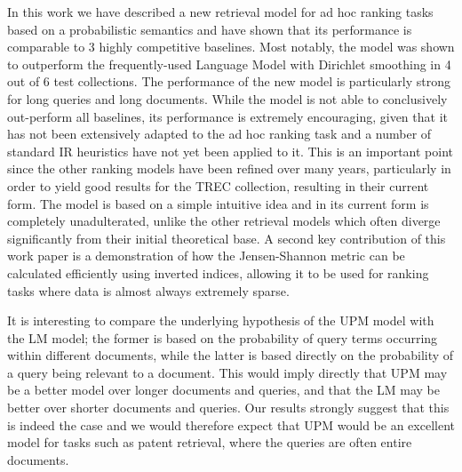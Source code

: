 In this work we have described a new retrieval model for ad hoc ranking tasks based on a probabilistic semantics and have shown that its performance is comparable to 3 highly competitive baselines. Most notably, the model was shown to outperform the frequently-used Language Model with Dirichlet smoothing in 4 out of 6 test collections. The performance of the new model is particularly strong for long queries and long documents. While the model is not able to conclusively out-perform all baselines, its performance is extremely encouraging, given that it has not been extensively adapted to the ad hoc ranking task and a number of standard IR heuristics have not yet been applied to it. This is an important point since the other ranking models have been refined over many years, particularly in order to yield good results for the TREC collection, resulting in their current form. The model is based on a simple intuitive idea and in its current form is completely unadulterated, unlike the other retrieval models which often diverge significantly from their initial theoretical base. A second key contribution of this work paper is a demonstration of how the Jensen-Shannon metric can be calculated efficiently using inverted indices, allowing it to be used for ranking tasks where data is almost always extremely sparse.

It is interesting to compare the underlying hypothesis of the UPM model with the LM model; the former is based on the probability of query terms occurring within different documents, while the latter is based directly on the probability of a query being relevant to a document. This would imply directly that UPM may be a better model over longer documents and queries, and that the LM may be better over shorter documents and queries. Our results strongly suggest that this is indeed the case and we would therefore expect that UPM would be an excellent model for tasks such as patent retrieval, where the queries are often entire documents.

